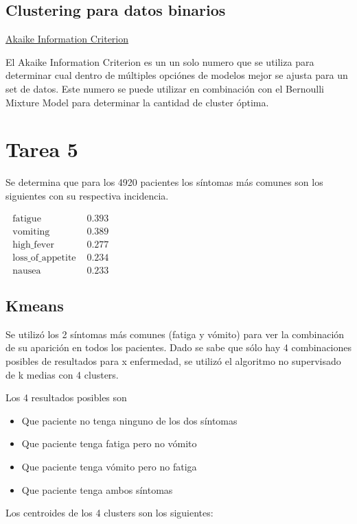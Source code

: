 \documentclass[twocolumn]{bmcart}%
\begin{document}
\subsection*{Clustering para datos binarios}
\href{https://builtin.com/data-science/what-is-aic}{Akaike Information Criterion}


El Akaike Information Criterion es un un solo numero que se utiliza para determinar cual dentro de múltiples opciónes de modelos mejor se ajusta para un set de datos. Este numero se puede utilizar en combinación con el Bernoulli Mixture Model para determinar la cantidad de cluster óptima. 


\section*{Tarea 5}

Se determina que para los 4920 pacientes los síntomas más comunes son los siguientes con su respectiva incidencia. 


$\begin{array}{ll}\text { fatigue } & 0.393 \\ \text { vomiting } & 0.389 \\ \text { high_fever } & 0.277 \\ \text { loss_of_appetite } & 0.234 \\ \text { nausea } & 0.233\end{array}$

\subsection*{Kmeans}
Se utilizó los 2 síntomas más comunes (fatiga y vómito) para ver la combinación de su aparición en todos los pacientes. Dado se sabe que sólo hay 4 combinaciones posibles de resultados para x enfermedad, se utilizó el algoritmo no supervisado de k medias con 4 clusters. 


Los 4 resultados posibles son


\begin{itemize}
    \item Que paciente no tenga ninguno de los dos síntomas
    \item Que paciente tenga fatiga pero no vómito
    \item Que paciente tenga vómito pero no fatiga
\item Que paciente tenga ambos síntomas
\end{itemize}

Los centroides de los 4 clusters son los siguientes: 
\end{document}
